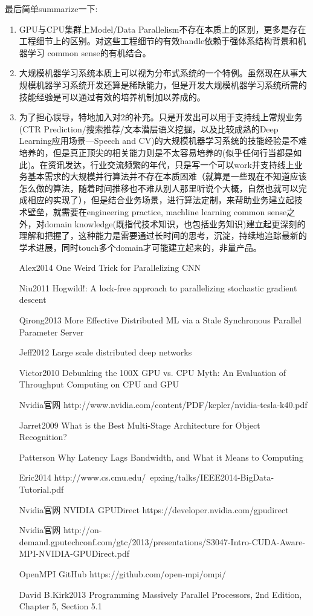 最后简单summarize一下:
\begin{enumerate}
  \item GPU与CPU集群上Model/Data Parallelism不存在本质上的区别，更多是存在工程细节上的区别。对这些工程细节的有效handle依赖于强体系结构背景和机器学习 common sense的有机结合。
  \item 大规模机器学习系统本质上可以视为分布式系统的一个特例。虽然现在从事大规模机器学习系统开发还算是稀缺能力，但是开发大规模机器学习系统所需的技能经验是可以通过有效的培养机制加以养成的。
  \item 为了担心误导，特地加入对2的补充。只是开发出可以用于支持线上常规业务(CTR Prediction/搜索推荐/文本潜层语义挖掘，以及比较成熟的Deep Learning应用场景—Speech and CV)的大规模机器学习系统的技能经验是不难培养的，但是真正顶尖的相关能力则是不太容易培养的(似乎任何行当都是如此)。在资讯发达，行业交流频繁的年代，只是写一个可以work并支持线上业务基本需求的大规模并行算法并不存在本质困难（就算是一些现在不知道应该怎么做的算法，随着时间推移也不难从别人那里听说个大概，自然也就可以完成相应的实现了），但是结合业务场景，进行算法定制，来帮助业务建立起技术壁垒，就需要在engineering practice, machline learning common sense之外，对domain knowledge(既指代技术知识，也包括业务知识)建立起更深刻的理解和把握了，这种能力是需要通过长时间的思考，沉淀，持续地追踪最新的学术进展，同时touch多个domain才可能建立起来的，非量产品。
\end{enumerate}

\begin{itemize}
  \item [Alex2014] One Weird Trick for Parallelizing CNN
  \item [Niu2011] Hogwild!: A lock-free approach to parallelizing stochastic gradient descent 
  \item [Qirong2013] More Effective Distributed ML via a Stale Synchronous Parallel Parameter Server
  \item [Jeff2012]Large scale distributed deep networks 
  \item [Victor2010]Debunking the 100X GPU vs. CPU Myth: An Evaluation of Throughput Computing on CPU and GPU
  \item [Nvidia官网]http://www.nvidia.com/content/PDF/kepler/nvidia-tesla-k40.pdf
  \item [Jarret2009]What is the Best Multi-Stage Architecture for Object Recognition? 
  \item [Patterson]Why Latency Lags Bandwidth, and What it Means to Computing 
  \item [Eric2014]http://www.cs.cmu.edu/~epxing/talks/IEEE2014-BigData-Tutorial.pdf
  \item [Nvidia官网]NVIDIA GPUDirect https://developer.nvidia.com/gpudirect
  \item [Nvidia官网]http://on-demand.gputechconf.com/gtc/2013/presentations/S3047-Intro-CUDA-Aware-MPI-NVIDIA-GPUDirect.pdf
  \item [OpenMPI GitHub]https://github.com/open-mpi/ompi/
  \item [David B.Kirk2013]Programming Massively Parallel Processors, 2nd Edition, Chapter 5, Section 5.1
\end{itemize}


